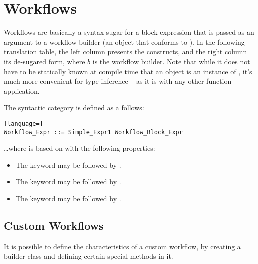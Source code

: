 \section{Workflows}
\label{sec:workflows}

Workflows are basically a syntax sugar for a block expression that is passed as an argument to a workflow builder (an object that conforms to ). In the following translation table, the left column presents the constructs, and the right column its de-sugared form, where $b$ is the workflow builder. Note that while it does not have to be statically known at compile time that an object is an instance of , it's much more convenient for type inference -- as it is with any other function application. 

The syntactic category  is defined as a follows:

\syntax\begin{lstlisting}[language=]
Workflow_Expr ::= Simple_Expr1 Workflow_Block_Expr
\end{lstlisting}

\ldots where  is based on  with the following properties:
\begin{itemize}
  \item The keyword  may be followed by \code{!}. 
  \item The keyword  may be followed by \code{!}. 
  \item The keyword  may be followed by \code{!}. 
\end{itemize}






\subsection{Custom Workflows}

It is possible to define the characteristics of a custom workflow, by creating a builder class and defining certain special methods in it. 



